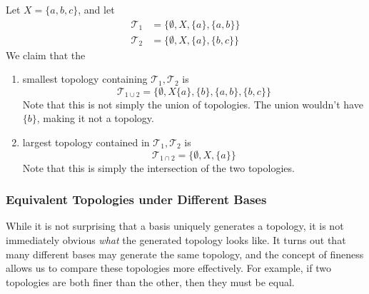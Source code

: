 \documentclass{article}
\begin{document}
      \begin{example}
        Let $X = \{a, b, c\}$, and let 
        \begin{align}
          \mathscr{T}_1 & = \{\emptyset, X, \{a\}, \{a, b\}\} \\
          \mathscr{T}_2 & = \{\emptyset, X, \{a\}, \{b, c\}\}
        \end{align}
        We claim that the 
        \begin{enumerate}
          \item smallest topology containing $\mathscr{T}_1, \mathscr{T}_2$ is 
          \begin{equation}
            \mathscr{T}_{1 \cup 2} = \{\emptyset, X \{a\}, \{b\}, \{a, b\}, \{b, c\}\}
          \end{equation} 
          Note that this is not simply the union of topologies. The union wouldn't have $\{b\}$, making it not a topology. 

          \item largest topology contained in $\mathscr{T}_1, \mathscr{T}_2$ is 
          \begin{equation}
            \mathscr{T}_{1 \cap 2} = \{\emptyset, X, \{a\}\}
          \end{equation}
          Note that this is simply the intersection of the two topologies. 
        \end{enumerate}
      \end{example}
    
    \subsubsection{Equivalent Topologies under Different Bases} 

      While it is not surprising that a basis uniquely generates a topology, it is not immediately obvious \textit{what} the generated topology looks like. It turns out that many different bases may generate the same topology, and the concept of fineness allows us to compare these topologies more effectively. For example, if two topologies are both finer than the other, then they must be equal. 
\end{document}
